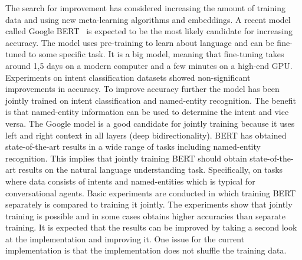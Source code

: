 The search for improvement has considered increasing the amount of training data and using new meta-learning algorithms and embeddings.
A recent model called Google BERT~\citep{devlin2018} is expected to be the most likely candidate for increasing accuracy.
The model uses pre-training to learn about language and can be fine-tuned to some specific task.
It is a big model, meaning that fine-tuning takes around 1,5 days on a modern computer and a few minutes on a high-end GPU.
Experiments on intent classification datasets showed non-significant improvements in accuracy.
To improve accuracy further the model has been jointly trained on intent classification and named-entity recognition.
The benefit is that named-entity information can be used to determine the intent and vice versa.
The Google model is a good candidate for jointly training because it uses left and right context in all layers (deep bidirectionality).
BERT has obtained state-of-the-art results in a wide range of tasks including named-entity recognition.
This implies that jointly training BERT should obtain state-of-the-art results on the natural language understanding task.
Specifically, on tasks where data consists of intents and named-entities which is typical for conversational agents.
Basic experiments are conducted in which training BERT separately is compared to training it jointly.
The experiments show that jointly training is possible and in some cases obtains higher accuracies than separate training.
It is expected that the results can be improved by taking a second look at the implementation and improving it.
One issue for the current implementation is that the implementation does not shuffle the training data.

\iffalse
In general the NLP field is in an interesting state.
Technology companies have a lot of incentive to push the field forward.
Leaps in the last few years have come from those companies.
For example, FastText by Facebook and transformer models by Google.
A second observation is that state-of-the-art scores are increased every few months.
This results in papers which are quickly pushed to arXiv and cited before any scholarly peer review.
Papers report accuracy high scores with ``few mentions of average cases and variability or worst-cases''~\citep{otter2018survey}.
\fi

